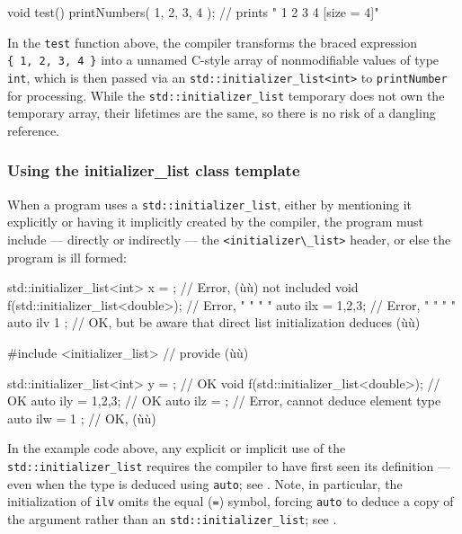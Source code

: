 \begin{emcppslisting}[emcppsbatch=e2]
void test()
{
    printNumbers({ 1, 2, 3, 4 });  // prints "{ 1 2 3 4 } [size = 4]"
}
\end{emcppslisting}
    

\noindent In the \lstinline!test! function above, the compiler transforms the braced
expression
\lstinline!{!~\lstinline!1,!~\lstinline!2,!~\lstinline!3,!~\lstinline!4!~\lstinline!}!
into a  unnamed C-style array of nonmodifiable values
of type \lstinline!int!, which is then passed via an
\lstinline!std::initializer_list<int>! to \lstinline!printNumber! for
processing. While the \lstinline!std::initializer_list! temporary does not
own the temporary array, their lifetimes are the same, so there is no
risk of a dangling reference.

\subsubsection[Using the \lstinline!initializer_list! class template]{Using the {\SubsubsecCode initializer\_list} class template}\label{using-the-initializer_list-class-template}

When a program uses a \lstinline!std::initializer_list!, either by
mentioning it explicitly or having it implicitly created by the
compiler, the program must include --- directly or indirectly --- the
\lstinline!<initializer\_list>! header, or else the program is ill formed:

\begin{emcppslisting}
std::initializer_list<int> x = { };  // Error, (ù{}ù) not included
void f(std::initializer_list<double>);  // Error,    "         "      "      "
auto ilx = {1,2,3};                     // Error,    "         "      "      "
auto ilv { 1 };  // OK, but be aware that direct list initialization deduces (ù{}ù)

#include <initializer_list>             // provide (ù{}ù)

std::initializer_list<int> y = { };     // OK
void f(std::initializer_list<double>);  // OK
auto ily = {1,2,3};                     // OK
auto ilz = { };                         // Error, cannot deduce element type
auto ilw = { 1 };                       // OK, (ù{}ù)
\end{emcppslisting}
    

\noindent In the example code above, any explicit or implicit use of the
\lstinline!std::initializer_list! requires the compiler to have first seen
its definition --- even when the type is deduced using \lstinline!auto!;
see . Note, in particular, the
initialization of \lstinline!ilv! omits the equal (\lstinline!=!) symbol,
forcing \lstinline!auto! to deduce a copy of the argument rather than an
\lstinline!std::initializer_list!; see . 

